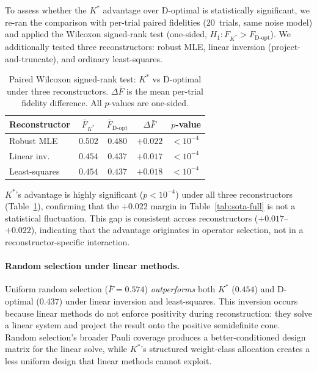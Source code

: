 \documentclass[twocolumn,prx,aps,superscriptaddress,longbibliography]{revtex4-2}
\begin{document}
To assess whether the $K^*$ advantage over D-optimal is
statistically significant, we re-ran the comparison with per-trial
paired fidelities ($20$~trials, same noise model) and applied the
Wilcoxon signed-rank test (one-sided, $H_1\colon F_{K^*} > F_\text{D-opt}$).
We additionally tested three reconstructors: robust MLE, linear
inversion (project-and-truncate), and ordinary least-squares.

\begin{table}[tb]
\centering
\caption{Paired Wilcoxon signed-rank test: $K^*$ vs D-optimal
under three reconstructors.  $\Delta\bar{F}$ is the mean
per-trial fidelity difference.  All $p$-values are one-sided.}
\label{tab:significance}
\begin{tabular}{lcccl}
\toprule
Reconstructor & $\bar{F}_{K^*}$ & $\bar{F}_\text{D-opt}$ & $\Delta\bar{F}$ & $p$-value \\
\midrule
Robust MLE    & $0.502$ & $0.480$ & $+0.022$ & $< 10^{-4}$ \\
Linear inv.   & $0.454$ & $0.437$ & $+0.017$ & $< 10^{-4}$ \\
Least-squares & $0.454$ & $0.437$ & $+0.018$ & $< 10^{-4}$ \\
\bottomrule
\end{tabular}
\end{table}

$K^*$'s advantage is highly significant ($p < 10^{-4}$) under all
three reconstructors (Table~\ref{tab:significance}), confirming
that the $+0.022$ margin in Table~\ref{tab:sota-full} is not a
statistical fluctuation.  This gap is consistent across
reconstructors ($+0.017$--$+0.022$), indicating that the advantage
originates in operator selection, not in a reconstructor-specific
interaction.

\paragraph{Random selection under linear methods.}
Uniform random selection ($\bar{F} = 0.574$) \emph{outperforms}
both $K^*$ ($0.454$) and D-optimal ($0.437$) under linear
inversion and least-squares.  This inversion occurs because
linear methods do not enforce positivity during reconstruction:
they solve a linear system and project the result onto the
positive semidefinite cone.  Random selection's broader Pauli
coverage produces a better-conditioned design matrix for the
linear solve, while $K^*$'s structured weight-class allocation
creates a less uniform design that linear methods cannot exploit.
\end{document}
